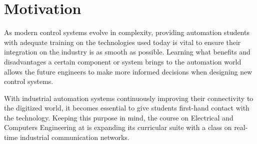 \section{Motivation} \label{sec:motivation}

As modern control systems evolve in complexity, providing automation students with adequate training on the technologies used today is vital to ensure their integration on the industry is as smooth as possible. Learning what benefits and disadvantages a certain component or system brings to the automation world allows the future engineers to make more informed decisions when designing new control systems.

With industrial automation systems continuously improving their connectivity to the digitized world, it becomes essential to give students first-hand contact with the technology. Keeping this purpose in mind, the course on Electrical and Computers Engineering at \Feup{} is expanding its curricular suite with a class on real-time industrial communication networks.
